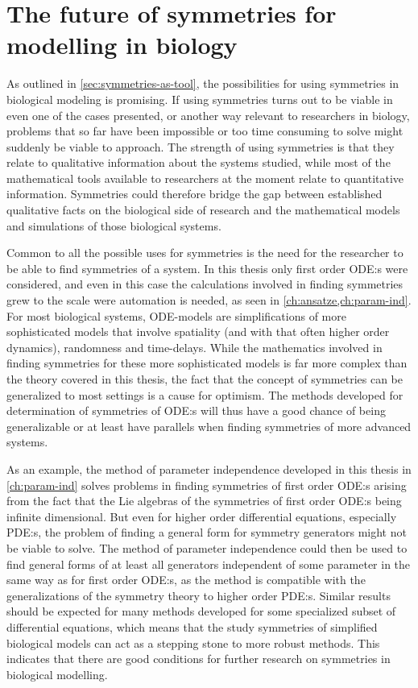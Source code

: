 
\section{The future of symmetries for modelling in biology} \label{sec:future}

As outlined in \cref{sec:symmetries-as-tool}, the possibilities for using symmetries in biological modeling is promising.
If using symmetries turns out to be viable in even one of the cases presented, or another way relevant to researchers in biology, problems that so far have been impossible or too time consuming to solve might suddenly be viable to approach.
The strength of using symmetries is that they relate to qualitative information about the systems studied, while most of the mathematical tools available to researchers at the moment relate to quantitative information.
Symmetries could therefore bridge the gap between established qualitative facts on the biological side of research and the mathematical models and simulations of those biological systems.

Common to all the possible uses for symmetries is the need for the researcher to be able to find symmetries of a system.
In this thesis only first order ODE:s were considered, and even in this case the calculations involved in finding symmetries grew to the scale were automation is needed, as seen in \cref{ch:ansatze,ch:param-ind}.
For most biological systems, ODE-models are simplifications of more sophisticated models that involve spatiality (and with that often higher order dynamics), randomness and time-delays.
While the mathematics involved in finding symmetries for these more sophisticated models is far more complex than the theory covered in this thesis, the fact that the concept of symmetries can be generalized to most settings is a cause for optimism.
The methods developed for determination of symmetries of ODE:s will thus have a good chance of being generalizable or at least have parallels when finding symmetries of more advanced systems.

As an example, the method of parameter independence developed in this thesis in \cref{ch:param-ind} solves problems in finding symmetries of first order ODE:s arising from the fact that the Lie algebras of the symmetries of first order ODE:s being infinite dimensional.
But even for higher order differential equations, especially PDE:s, the problem of finding a general form for symmetry generators might not be viable to solve.
The method of parameter independence could then be used to find general forms of at least all generators independent of some parameter in the same way as for first order ODE:s, as the method is compatible with the generalizations of the symmetry theory to higher order PDE:s.
Similar results should be expected for many methods developed for some specialized subset of differential equations, which means that the study symmetries of simplified biological models can act as a stepping stone to more robust methods.
This indicates that there are good conditions for further research on symmetries in biological modelling.

